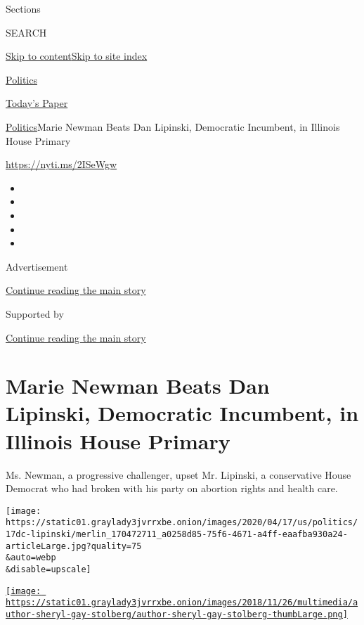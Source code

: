 Sections

SEARCH

\protect\hyperlink{site-content}{Skip to
content}\protect\hyperlink{site-index}{Skip to site index}

\href{https://www.nytimes3xbfgragh.onion/section/politics}{Politics}

\href{https://myaccount.nytimes3xbfgragh.onion/auth/login?response_type=cookie\&client_id=vi}{}

\href{https://www.nytimes3xbfgragh.onion/section/todayspaper}{Today's
Paper}

\href{/section/politics}{Politics}\textbar{}Marie Newman Beats Dan
Lipinski, Democratic Incumbent, in Illinois House Primary

\href{https://nyti.ms/2ISeWgw}{https://nyti.ms/2ISeWgw}

\begin{itemize}
\item
\item
\item
\item
\item
\end{itemize}

Advertisement

\protect\hyperlink{after-top}{Continue reading the main story}

Supported by

\protect\hyperlink{after-sponsor}{Continue reading the main story}

\hypertarget{marie-newman-beats-dan-lipinski-democratic-incumbent-in-illinois-house-primary}{%
\section{Marie Newman Beats Dan Lipinski, Democratic Incumbent, in
Illinois House
Primary}\label{marie-newman-beats-dan-lipinski-democratic-incumbent-in-illinois-house-primary}}

Ms. Newman, a progressive challenger, upset Mr. Lipinski, a conservative
House Democrat who had broken with his party on abortion rights and
health care.

\texttt{[image: https://static01.graylady3jvrrxbe.onion/images/2020/04/17/us/politics/17dc-lipinski/merlin\_170472711\_a0258d85-75f6-4671-a4ff-eaafba930a24-articleLarge.jpg?quality=75\\\&auto=webp\\\&disable=upscale]}

\href{https://www.nytimes3xbfgragh.onion/by/sheryl-gay-stolberg}{\texttt{[image: https://static01.graylady3jvrrxbe.onion/images/2018/11/26/multimedia/author-sheryl-gay-stolberg/author-sheryl-gay-stolberg-thumbLarge.png]}}


